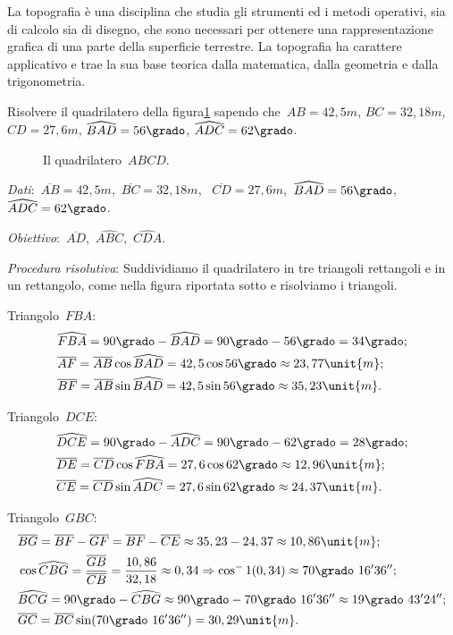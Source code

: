 La topografia è una disciplina che studia gli strumenti ed i metodi 
operativi, 
sia di calcolo sia di disegno, che sono necessari per ottenere
una rappresentazione grafica di una parte della superficie terrestre.
La topografia ha carattere applicativo e trae la sua base teorica dalla 
matematica, dalla geometria e dalla trigonometria.

 \begin{esempio}
Risolvere il quadrilatero della figura\ref{fig:G.7} sapendo 
che~$AB=42,5\unit{m}$, $BC=32,18\unit{m}$, $CD=27,6\unit{m}$,
$\widehat{BAD}=56\grado$, $\widehat{ADC}=62\grado$.
\begin{inaccessibleblock}
 \begin{figure}[t]
\centering

\caption{Il quadrilatero~$ABCD$.}\label{fig:G.7}
\end{figure}
\end{inaccessibleblock}

\emph{Dati}:~$\overline{AB}=42,5\unit{m}$,\quad~$\overline{BC}=32,18\unit{m}$,
\quad~$\overline{CD}=27,6\unit{m}$,\quad~$\widehat{BAD}=56\grado$,
\quad~$\widehat{ADC}=62\grado$.

\emph{Obiettivo}:~$\overline{AD}$,\quad~$\widehat{ABC}$,\quad~$\widehat{CDA}$.

\emph{Procedura risolutiva}:
Suddividiamo il quadrilatero in tre triangoli rettangoli e in un rettangolo, 
come nella figura riportata sotto e risolviamo i triangoli.

Triangolo~$FBA$:
\begin{align*}
&\widehat{FBA}=90\grado-\widehat{BAD}=90\grado-56\grado=34\grado;\\
&\overline{AF}=\overline{AB}\cos \widehat{BAD} = 42,5\cos 56\grado \approx23,
77\unit{m};\\
&\overline{BF}=\overline{AB}\sin \widehat{BAD} =42,5 \sin 56\grado\approx35,
23\unit{m}.
\end{align*}

Triangolo~$DCE$:
\begin{align*}
 &\widehat{DCE}=90\grado-\widehat{ADC}=90\grado-62\grado=28\grado;\\
&\overline{DE}=\overline{CD}\cos \widehat{FBA}=27,6\cos 62\grado \approx12,
96\unit{m};\\
&\overline{CE}=\overline{CD}\sin \widehat{ADC} =27,6 \sin 62\grado \approx24,
37\unit{m}.
\end{align*}

Triangolo~$GBC$:
\begin{align*}
&\overline{BG}=\overline{BF}-\overline{GF}=\overline{BF}-\overline{CE}
\approx35,
23-24,37\approx10,86\unit{m};\\
&\cos \widehat{CBG}=\frac{\overline{GB}}{\overline{CB}}=\frac{10,86}{32,18}
\approx0,34\Rightarrow\cos^-1(0,34)\approx70\grado~16' 36'';\\
&\widehat{BCG}=90\grado-\widehat{CBG}\approx90\grado-70\grado~16' 
36''\approx19\grado~43' 24'';\\
&\overline{GC}=\overline{BC}\sin (70\grado~16' 36'')=30,29\unit{m}.
\end{align*}


\end{esempio}
